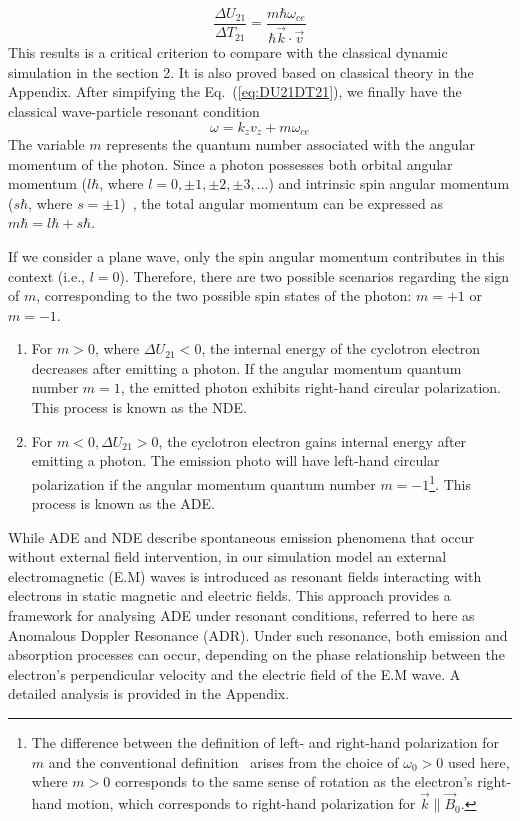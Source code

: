 \documentclass{cpbtex}
\begin{document}
\begin{CJK*}{GBK}{song}
\begin{equation}
\frac{\Delta U_{21}}{\Delta T_{21}} = \frac{m \hbar \omega_{ce}}{\hbar \vec{k} \cdot \vec{v}}  \label{eq:DU21DT21}
\end{equation}
 This results is a critical criterion to compare with the classical dynamic simulation in the section 2. It is also proved based on classical theory in the Appendix.
After simpifying the Eq.~(\ref{eq:DU21DT21}), we finally have the classical wave-particle resonant condition 
\begin{equation}
\omega = k_z v_z + m \omega_{ce}
\end{equation}
The variable \( m \) represents the quantum number associated with the angular momentum of the photon. Since a photon possesses both orbital angular momentum (\( l\hbar\), where \(l = 0,\pm1,\pm2,\pm3,... \)) and intrinsic spin angular momentum (\( s\hbar \), where \( s = \pm 1 \))~\cite{arnaut2000orbital}, the total angular momentum can be expressed as \( m\hbar = l\hbar + s\hbar \). 

If we consider a plane wave, only the spin angular momentum contributes in this context (i.e., \( l = 0 \)). Therefore, there are two possible scenarios regarding the sign of \( m \), corresponding to the two possible spin states of the photon: \( m = +1 \) or \( m = -1 \).

\begin{enumerate}
\item  	For $m>0$, where $\Delta U_{21}<0$, the internal energy of the cyclotron electron decreases after emitting a photon. If the angular momentum quantum number $m =1$, the emitted photon exhibits right-hand circular polarization. This process is known as the NDE.
\item    	For $m<0, \Delta U_{21}>0$, the cyclotron electron gains internal energy after emitting a photon. The emission photo will have left-hand circular polarization if the angular momentum quantum number $m = -1$\footnote{The difference between the definition of left- and right-hand polarization for \( m \) and the conventional definition~\cite{kiang2008angular} arises from the choice of \( \omega_0 > 0 \) used here, where \( m > 0 \) corresponds to the same sense of rotation as the electron's right-hand motion, which corresponds to right-hand polarization for \( \vec{k} \parallel \vec{B}_0 \).
}. This process is known as the ADE. 
\end{enumerate}


While ADE and NDE describe spontaneous emission phenomena that occur without external field intervention, in our simulation model an external electromagnetic (E.M) waves is introduced as resonant fields interacting with electrons in static magnetic and electric fields. This approach provides a framework for analysing ADE under resonant conditions, referred to here as Anomalous Doppler Resonance (ADR). Under such resonance, both emission and absorption processes can occur, depending on the phase relationship between the electron’s perpendicular velocity and the electric field of the E.M wave. A detailed analysis is provided in the Appendix.



\end{CJK*}
\end{document}
